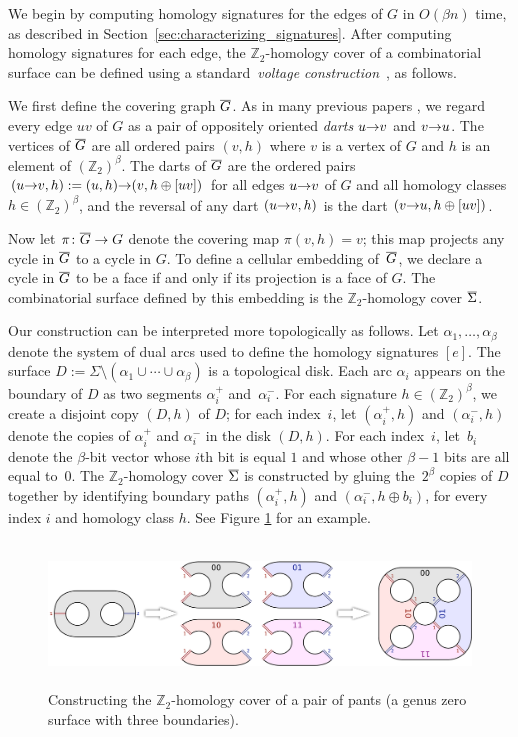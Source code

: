 \documentclass[11pt,twoside]{article}
\def\arcto{\mathord\shortrightarrow}
\def\arc#1#2{#1\arcto#2}
\def\Z{\mathbb{Z}}
\def\dualarc{\alpha}
\def\Sigmabar{\overline{\smash{\Sigma}\vphantom{t}}}
\def\Gbar{\overline{\smash{G}\vphantom{t}}}
\begin{document}
We begin by computing homology signatures for the edges of $G$ in $O(\beta n)$ time, as described in Section~\ref{sec:characterizing_signatures}.
After computing homology signatures for each edge, the $\Z_2$-homology cover of a combinatorial surface can be defined using a standard~\emph{voltage construction}~\cite[Chapter 4]{gt-tgt-01}, as follows.

We first define the covering graph $\Gbar$.  As in many previous papers \cite{lots, stuff, blah, blurg}, we regard every edge $uv$ of $G$ as a pair of oppositely oriented \emph{darts} $\arc{u}{v}$ and $\arc{v}{u}$.  The vertices of $\Gbar$ are all ordered pairs $(v, h)$ where $v$ is a vertex of $G$ and $h$ is an element of $(\Z_2)^\beta$.  The darts of $\Gbar$ are the ordered pairs $(\arc{u}{v}, h) := (u, h)\arcto(v, h\oplus [uv])$ for all edges $\arc{u}{v}$ of $G$ and all homology classes $h \in (\Z_2)^\beta$, and the reversal of any dart $(\arc{u}{v}, h)$ is the dart $(\arc{v}{u}, h\oplus[uv])$.

Now let $\pi\colon \Gbar\to G$ denote the covering map $\pi(v, h) = v$; this map projects any cycle in $\Gbar$ to a cycle in $G$.  To define a cellular embedding of~$\Gbar$, we declare a cycle in $\Gbar$ to be a face if and only if its projection is a face of $G$.  The combinatorial surface defined by this embedding is the $\Z_2$-homology cover $\Sigmabar$.

Our construction can be interpreted more topologically as follows.  Let $\dualarc_1, \dots, \dualarc_\beta$ denote the system of dual arcs used to define the homology signatures $[e]$.  The surface $D := \Sigma\setminus(\dualarc_1\cup\cdots\cup \dualarc_\beta)$ is a topological disk.  Each arc $\dualarc_i$ appears on the boundary of $D$ as two segments $\dualarc^+_i$ and~$\dualarc^-_i$.  For each signature $h\in (\Z_2)^\beta$, we create a disjoint copy $(D,h)$ of $D$; for each index~$i$, let $(\dualarc^+_i, h)$ and $(\dualarc^-_i, h)$ denote the copies of $\dualarc^+_i$ and $\dualarc^-_i$ in the disk $(D, h)$.  For each index~$i$, let~$b_i$ denote the $\beta$-bit vector whose $i$th bit is equal $1$ and whose other $\beta-1$ bits are all equal to~$0$.  The $\Z_2$-homology cover $\Sigmabar$ is constructed by gluing the~$2^\beta$ copies of $D$ together by identifying boundary paths $(\dualarc^+_i,h)$ and $(\dualarc^-_i, h\oplus b_i)$, for every index $i$ and homology class $h$.  See Figure \ref{fig:cover-ex} for an example.

\begin{figure}
\centering
\includegraphics[height=1.5in]{Fig/hom-cover-example}
\caption{Constructing the $\Z_2$-homology cover of a pair of pants (a genus zero surface with three boundaries).}
\label{fig:cover-ex}
\end{figure}
\end{document}
